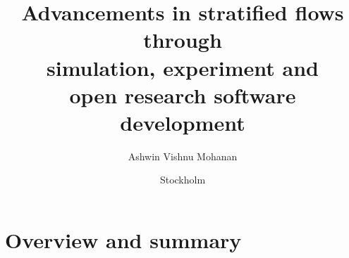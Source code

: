 \documentclass{./templates/mechthesis/MechThesis}
\title[%
  Advancements in stratified flows through simulation, experiment and open research software development%
]%
{%
  Advancements in stratified flows through \\ simulation, experiment and \\ open
  research software development%
}%
\author{Ashwin Vishnu Mohanan}%
\affiliation
{%
	Department of Mechanics, KTH Royal Institute of Technology,\\
	SE--100 44 Stockholm, Sweden%
}%
\date{Stockholm}{{August}}{{2019}}%
\begin{document}
%
\frontmatter



\printglossary
\printglossary[type=\acronymtype]
%
\mainmatter


\part{Overview and summary}

%
\begin{refsection}
  
\end{refsection}

%


%

%

%


\begin{refsection}
 
\end{refsection}

\begin{refsection}
 
\end{refsection}

\begin{refsection}
 
\end{refsection}
\end{document}

